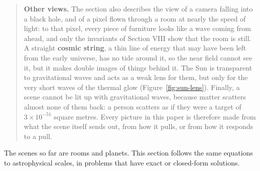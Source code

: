 \begin{quote}
\textbf{Other views.} The section also describes the view of a camera falling
into a black hole, and of a pixel flown through a room at nearly the speed of
light: to that pixel, every piece of furniture looks like a wave coming from
ahead, and only the invariants of Section VIII show that the room is still. A
straight \textbf{cosmic string}, a thin line of energy that may have been left
from the early universe, has no tide around it, so the near field cannot see it,
but it makes double images of things behind it. The Sun is transparent to
gravitational waves and acts as a weak lens for them, but only for the very
short waves of the thermal glow (Figure~\ref{fig:sun-lens}). Finally, a scene cannot be lit up with
gravitational waves, because matter scatters almost none of them back: a person
scatters as if they were a target of $3\times10^{-51}$ square metres. Every
picture in this paper is therefore made from what the scene itself sends out,
from how it pulls, or from how it responds to a pull.
\end{quote}

The scenes so far are rooms and planets. This section follows the same
equations to astrophysical scales, in problems that
have exact or closed-form solutions.

